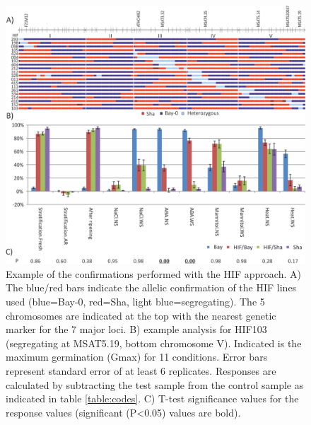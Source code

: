 \begin{figure}[h!]
  \centering
  \includegraphics[keepaspectratio,scale=0.30]{eps/image_3_1_8.eps}
  \caption[QTL confirmation.]{Example of the confirmations performed with the HIF approach. A) The blue/red bars 
          indicate the allelic confirmation of the HIF lines used (blue=Bay-0, red=Sha, light blue=segregating). 
          The 5 chromosomes are indicated at the top with the nearest genetic marker for the 7 major loci. B) example 
          analysis for HIF103 (segregating at MSAT5.19, bottom chromosome V). Indicated is the maximum germination 
          (Gmax) for 11 conditions. Error bars represent standard error of at least 6 replicates. Responses are 
          calculated by subtracting the test sample from the control sample as indicated in table \ref{table:codes}. C) T-test 
          significance values for the response values (significant (P<0.05) values are bold).}
          \label{fig:confirmation}
\end{figure}

